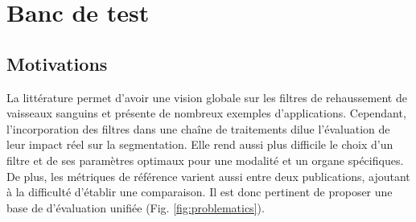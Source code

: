 %

\chapter{Banc de test}
\label{sec:Benchmark}


\section{Motivations}
\label{sec:Benchmark:Motivations}

 La littérature permet d'avoir une vision globale sur les filtres de rehaussement de vaisseaux sanguins et présente de nombreux exemples d'applications. Cependant, l'incorporation des filtres dans une chaîne de traitements dilue l'évaluation de leur impact réel sur la segmentation. Elle rend aussi plus difficile le choix d'un filtre et de ses paramètres optimaux pour une modalité et un organe spécifiques. De plus, les métriques de référence varient aussi entre deux publications, ajoutant à la difficulté d'établir une comparaison. Il est donc pertinent de proposer une base de d'évaluation unifiée (Fig. \ref{fig:problematics}).

